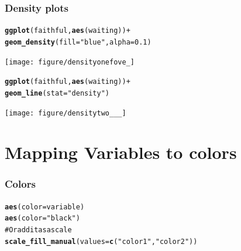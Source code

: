 \documentclass{beamer}\usepackage{graphicx, color}
\makeatletter
\newcommand{\hlfunctioncall}[1]{\textcolor[rgb]{0.501960784313725,0,0.329411764705882}{\textbf{#1}}}%
\newcommand{\hlstring}[1]{\textcolor[rgb]{0.6,0.6,1}{#1}}%
\newcommand{\hlcomment}[1]{\textcolor[rgb]{0.180392156862745,0.6,0.341176470588235}{#1}}%
\newenvironment{kframe}{%
 \def\at@end@of@kframe{}%
 \ifinner\ifhmode%
  \def\at@end@of@kframe{\end{minipage}}%
  \begin{minipage}{\columnwidth}%
 \fi\fi%
 \def\FrameCommand##1{\hskip\@totalleftmargin \hskip-\fboxsep
 \colorbox{shadecolor}{##1}\hskip-\fboxsep
     \hskip-\linewidth \hskip-\@totalleftmargin \hskip\columnwidth}%
 \MakeFramed {\advance\hsize-\width
   \@totalleftmargin\z@ \linewidth\hsize
   \@setminipage}}%
 {\par\unskip\endMakeFramed%
 \at@end@of@kframe}
\newenvironment{knitrout}{}{} %
\makeatother
\begin{document}
\begin{frame}[fragile]
\frametitle{Density plots}
\begin{knitrout}\footnotesize
{}\color{fgcolor}\begin{kframe}
\begin{alltt}
\hlfunctioncall{ggplot}(faithful, \hlfunctioncall{aes}(waiting)) +
\hlfunctioncall{geom_density}(fill = \hlstring{"blue"}, alpha = 0.1)
\end{alltt}
\end{kframe}
\texttt{[image: figure/densityonefove\_]} 

\end{knitrout}

\end{frame}



\begin{frame}[fragile]
\begin{knitrout}\footnotesize
{}\color{fgcolor}\begin{kframe}
\begin{alltt}
\hlfunctioncall{ggplot}(faithful, \hlfunctioncall{aes}(waiting)) +
\hlfunctioncall{geom_line}(stat = \hlstring{"density"})
\end{alltt}
\end{kframe}
\texttt{[image: figure/densitytwo\_\_\_]} 

\end{knitrout}

\end{frame}


\section*{Mapping Variables to colors}
\frame{\sectionpage}


\begin{frame}[fragile]
\frametitle{Colors}
\begin{knitrout}\footnotesize
{}\color{fgcolor}\begin{kframe}
\begin{alltt}
\hlfunctioncall{aes}(color = variable)
\hlfunctioncall{aes}(color = \hlstring{"black"})
\hlcomment{# Or add it as a scale}
\hlfunctioncall{scale_fill_manual}(values = \hlfunctioncall{c}(\hlstring{"color1"}, \hlstring{"color2"}))
\end{alltt}
\end{kframe}
\end{knitrout}

\end{frame}
\end{document}
